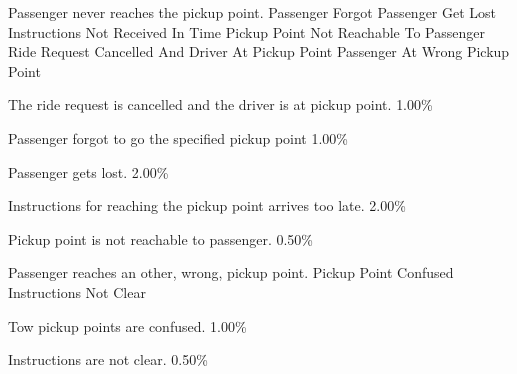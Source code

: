   \startkaosspec
  	 {Passenger never reaches the pickup point.}
  	 {Passenger Forgot}
  	 {Passenger Get Lost}
  	 {Instructions Not Received In Time}
  	 {Pickup Point Not Reachable To Passenger}
  	 {Ride Request Cancelled And Driver At Pickup Point}
  	 {Passenger At Wrong Pickup Point}
  \stopkaosspec
  
  \startkaosspec
  	 {The ride request is cancelled and the driver is at pickup point.}
  	 {1.00\%}
  \stopkaosspec
  
  \startkaosspec
  	 {Passenger forgot to go the specified pickup point}
  	 {1.00\%}
  \stopkaosspec
  
  \startkaosspec
  	 {Passenger gets lost.}
  	 {2.00\%}
  \stopkaosspec
  
  \startkaosspec
  	 {Instructions for reaching the pickup point arrives too late.}
  	 {2.00\%}
  \stopkaosspec
  
  \startkaosspec
  	 {Pickup point is not reachable to passenger.}
  	 {0.50\%}
  \stopkaosspec
  
  \startkaosspec
  	 {Passenger reaches an other, wrong, pickup point.}
  	 {Pickup Point Confused}
  	 {Instructions Not Clear}
  \stopkaosspec
  
  \startkaosspec
  	 {Tow pickup points are confused.}
  	 {1.00\%}
  \stopkaosspec
  
  \startkaosspec
  	 {Instructions are not clear.}
  	 {0.50\%}
  \stopkaosspec
    

    {}
  
